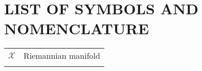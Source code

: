 

\chapter*{LIST OF SYMBOLS AND NOMENCLATURE}  %
\singlespacing
\begin{tabular}{l p{5in}} %

$\mathcal{X}$ & Riemannian manifold\\
\\

\end{tabular}


\doublespacing

